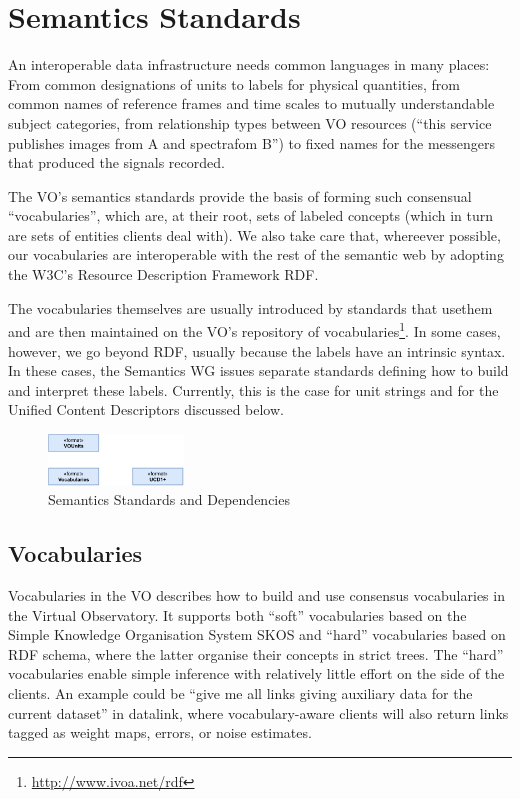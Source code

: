 \documentclass[11pt,letter]{ivoa}
\begin{document}
\section{Semantics Standards}

An interoperable data infrastructure needs common languages in many
places: From common designations of units to labels for physical
quantities, from common names of reference frames and time scales to
mutually understandable subject categories, from relationship types
between VO resources (``this service publishes images from A and spectrafom B'') to fixed names for the messengers that produced the signals
recorded.

The VO's semantics standards provide the basis of forming such
consensual ``vocabularies'', which are, at their root, sets of labeled
concepts (which in turn are sets of entities clients deal with).  We
also take care that, whereever possible, our vocabularies are
interoperable with the rest of the semantic web by adopting the W3C's
Resource Description Framework RDF.

The vocabularies themselves are usually introduced by standards that usethem and are then maintained on the VO's repository of
vocabularies\footnote{\url{http://www.ivoa.net/rdf}}.  In some cases,
however, we go beyond RDF, usually because the labels have an intrinsic
syntax.  In these cases, the Semantics WG issues separate standards
defining how to build and interpret these labels.  Currently, this is
the case for unit strings and for the Unified Content Descriptors
discussed below.

\begin{figure}[ht]
\centering
\includegraphics[width=0.32\textwidth]{ivoa-arch-semantics.pdf}
\caption{Semantics Standards and Dependencies}
\label{fig:semdeps}
\end{figure}

\subsection{Vocabularies}

Vocabularies in the VO \citep{2021ivoa.spec.0206D} describes how to
build and use
consensus vocabularies in the Virtual Observatory.  It supports both
``soft'' vocabularies based on the Simple Knowledge Organisation System
SKOS and ``hard'' vocabularies based on RDF schema, where the latter
organise their concepts in strict trees.  The ``hard'' vocabularies
enable simple inference with relatively little effort on the side of
the clients.  An example could be ``give me all links giving auxiliary
data for the current dataset'' in datalink, where vocabulary-aware
clients will also return links tagged as weight maps, errors, or noise
estimates.
\end{document}
